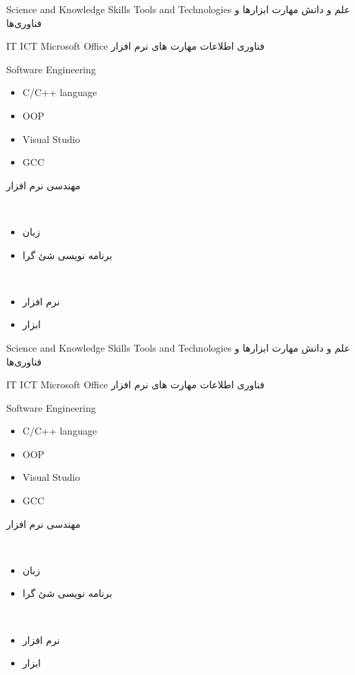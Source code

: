 
\craftC
{Science and Knowledge}
{Skills}
{Tools and Technologies}
{علم و دانش}
{مهارت}
{ابزارها و فناوری‌ها}
{}


\craftC
{IT}
{ICT}
{Microsoft Office}
{فناوری اطلاعات}
{مهارت های }
{نرم افزار }
{}


\craftC
{Software Engineering}
{\begin{itemize}
  \item C/C++ language
  \item OOP
\end{itemize}}
{\begin{itemize}
  \item Visual Studio
  \item GCC
\end{itemize}}
{مهندسی نرم افزار}
{\ \begin{itemize}
  \item زبان  
  \item برنامه نویسی شئ گرا
\end{itemize}}
{\ \begin{itemize}
  \item نرم افزار 
  \item ابزار 
\end{itemize}}
{}


\craftC
{Science and Knowledge}
{Skills}
{Tools and Technologies}
{علم و دانش}
{مهارت}
{ابزارها و فناوری‌ها}
{}


\craftC
{IT}
{ICT}
{Microsoft Office}
{فناوری اطلاعات}
{مهارت های }
{نرم افزار }
{}


\craftC
{Software Engineering}
{\begin{itemize}
  \item C/C++ language
  \item OOP
\end{itemize}}
{\begin{itemize}
  \item Visual Studio
  \item GCC
\end{itemize}}
{مهندسی نرم افزار}
{\ \begin{itemize}
  \item زبان  
  \item برنامه نویسی شئ گرا
\end{itemize}}
{\ \begin{itemize}
  \item نرم افزار 
  \item ابزار 
\end{itemize}}
{}
